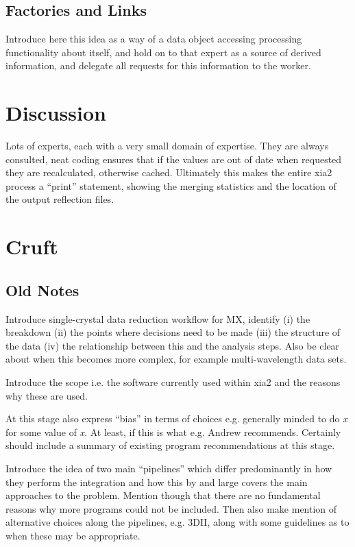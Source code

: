 \documentclass[a4paper,11pt]{article}
\begin{document}
\subsection{Factories and Links}

Introduce here this idea as a way of a data object accessing
processing functionality about itself, and hold on to that expert as a
source of derived information, and delegate all requests for this
information to the worker.

\section{Discussion}

Lots of experts, each with a very small domain of expertise. They are
always consulted, neat coding ensures that if the values are out of
date when requested they are recalculated, otherwise
cached. Ultimately this makes the entire xia2 process a ``print''
statement, showing the merging statistics and the location of the
output reflection files.

\section{Cruft}

\subsection{Old Notes}

Introduce single-crystal data reduction workflow for MX, identify (i)
the breakdown (ii) the points where decisions need to be made (iii)
the structure of the data (iv) the relationship between this and the
analysis steps. Also be clear about when this becomes more complex,
for example multi-wavelength data sets.

Introduce the scope i.e. the software currently used within xia2 and
the reasons why these are used.

At this stage also express ``bias'' in terms of choices e.g. generally
minded to do \emph{x} for some value of \emph{x}. At least, if this is
what e.g. Andrew recommends. Certainly should include a summary of
existing program recommendations at this stage.

Introduce the idea of two main ``pipelines'' which differ
predominantly in how they perform the integration and how this by and
large covers the main approaches to the problem. Mention though that
there are no fundamental reasons why more programs could not be
included. Then also make mention of alternative choices along the
pipelines, e.g. 3DII, along with some guidelines as to when these may
be appropriate.
\end{document}
